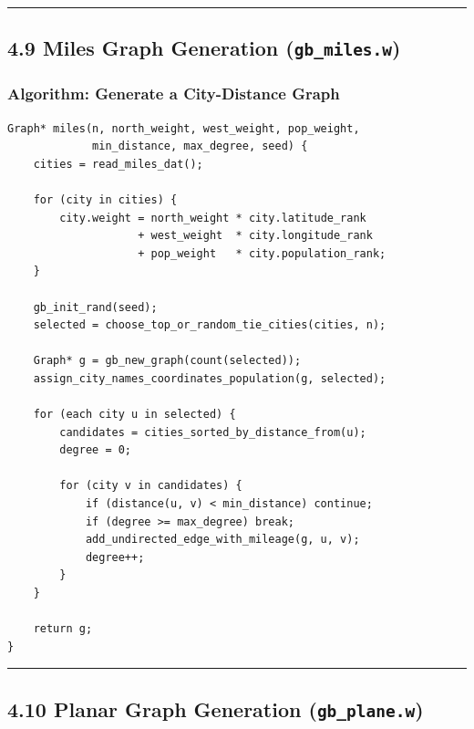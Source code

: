 \documentclass[11pt]{article}
\begin{document}
\begin{center}\rule{0.5\linewidth}{0.5pt}\end{center}

\subsection{\texorpdfstring{4.9 Miles Graph Generation (\texttt{gb\_miles.w})}{4.9 Miles Graph Generation (gb\_miles.w)}}\label{miles-graph-generation-gb_miles.w}

\subsubsection{Algorithm: Generate a City-Distance Graph}\label{algorithm-generate-a-city-distance-graph}

\begin{verbatim}
Graph* miles(n, north_weight, west_weight, pop_weight,
             min_distance, max_degree, seed) {
    cities = read_miles_dat();

    for (city in cities) {
        city.weight = north_weight * city.latitude_rank
                    + west_weight  * city.longitude_rank
                    + pop_weight   * city.population_rank;
    }

    gb_init_rand(seed);
    selected = choose_top_or_random_tie_cities(cities, n);

    Graph* g = gb_new_graph(count(selected));
    assign_city_names_coordinates_population(g, selected);

    for (each city u in selected) {
        candidates = cities_sorted_by_distance_from(u);
        degree = 0;

        for (city v in candidates) {
            if (distance(u, v) < min_distance) continue;
            if (degree >= max_degree) break;
            add_undirected_edge_with_mileage(g, u, v);
            degree++;
        }
    }

    return g;
}
\end{verbatim}

\begin{center}\rule{0.5\linewidth}{0.5pt}\end{center}

\subsection{\texorpdfstring{4.10 Planar Graph Generation (\texttt{gb\_plane.w})}{4.10 Planar Graph Generation (gb\_plane.w)}}\label{planar-graph-generation-gb_plane.w}
\end{document}
